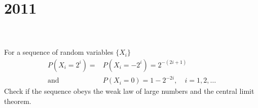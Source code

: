 \section*{2011}
\vspace{-.5cm}
\hrulefill \\\\
 For a sequence of random variables $\{X_i\}$ 
\[\begin{aligned}
    P(X_i=2^i) = &P(X_i = -2^i) = 2^{-(2i+1)} \\
    \text{and} \quad &P(X_i = 0) = 1 - 2^{-2i}, \quad i=1,2,\dots
\end{aligned}
\]
Check if the sequence obeys the weak law of large numbers and the central limit theorem.